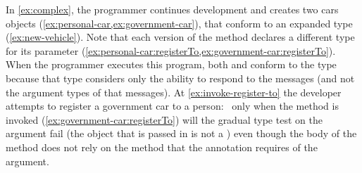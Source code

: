 


In \cref{ex:complex}, 
the programmer continues development and creates two cars objects 
(\cref{ex:personal-car,ex:government-car}),
that conform to an expanded  type (\cref{ex:new-vehicle}).
Note that each version of the  method
declares a different type for its parameter
(\cref{ex:personal-car:registerTo,ex:government-car:registerTo}).
When the programmer executes this program,
both  and  conform to the type
 because that type considers only the ability to respond
to the   messages
(and not the argument types of that messages).
At \cref{ex:invoke-register-to} the developer
attempts to register a government car to a person:%
~only when the method is invoked (\cref{ex:government-car:registerTo})
will the gradual type test on the argument fail
(the object that is passed in is not a )
even though the body of the  method
does not rely on the  method that the 
annotation requires of the argument.

